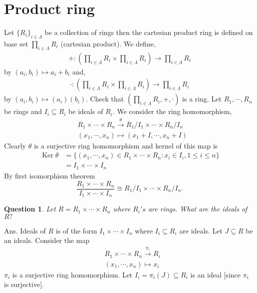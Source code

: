 \documentclass[11pt]{amsart}
\newtheorem{qns}[theorem]{Question}
\begin{document}
\section{Product ring}
Let $\{R_i\}_{i\in \Lambda}$ be a collection of rings then the cartesian product ring is defined on base set $\displaystyle\prod_{i\in \Lambda} R_i$ (cartesian product). We define,
\begin{align*}
+:\left(\displaystyle\prod_{i\in \Lambda} R_i \times \displaystyle\prod_{i\in \Lambda} R_i \right) \to \displaystyle\prod_{i\in \Lambda} R_i
\end{align*}
by $(a_i,b_i)\mapsto a_i+b_i$ and, \begin{align*}
\cdot :\left(\displaystyle\prod_{i\in \Lambda} R_i\times \displaystyle\prod_{i\in \Lambda} R_i\right)\to \displaystyle\prod_{i\in \Lambda} R_i
\end{align*}
by $(a_i,b_i)\mapsto (a_i)(b_i).$ Check that $\left(\displaystyle\prod_{i\in \Lambda} R_i,+,\cdot\right)$ is a ring. Let $R_1,\cdots ,R_n$ be rings and $I_i\subseteq R_i$ be ideals of $R_i.$ We consider the ring homomorphism, \begin{align*}
&R_1\times \cdots \times R_n \stackrel{\theta}{\longrightarrow} R_1/I_1\times \cdots \times R_n/I_n\\
&(x_1,\cdots ,x_n)\mapsto (x_1+I,\cdots ,x_n+I)
\end{align*}
Clearly $\theta$ is a surjective ring homomorphism and kernel of this map is \begin{align*}
\operatorname{Ker}\theta&=\{(x_1,\cdots ,x_n)\in R_1\times \cdots \times R_n: x_i\in I_i, 1\leq i\leq n\}\\
&=I_1\times \cdots \times I_n
\end{align*}
By first isomorphism theorem $$\dfrac{R_1\times \cdots \times R_n}{I_1\times \cdots \times I_n}\cong R_1/I_1\times \cdots \times R_n/I_n.$$
\begin{qns}
Let $R=R_1\times \cdots \times R_n$ where $R_i's$ are rings. What are the ideals of $R?$
\end{qns}
Ans. Ideals of $R$ is of the form $I_1\times \cdots \times I_n$ where $I_i\subseteq R_i$ are ideals. Let $J\subseteq R$ be an ideals. Consider the map \begin{align*}
&R_1\times \cdots \times R_n \stackrel{\pi_i}{\longrightarrow} R_i\\
&(x_1,\cdots ,x_n)\mapsto x_i
\end{align*}
$\pi_i$ is a surjective ring homomorphism. Let $I_i=\pi_i(J)\subseteq R_i$ is an ideal [since $\pi_i$ is surjective].\\
\end{document}
